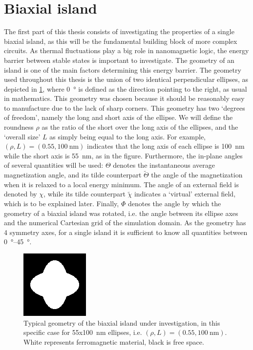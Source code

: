 \documentclass[11pt,a4paper,english]{article}
\begin{document}
\section{Biaxial island}
\label{par:Biaxial_island}
The first part of this thesis consists of investigating the properties of a single biaxial island, as this will be the fundamental building block of more complex circuits. As thermal fluctuations play a big role in nanomagnetic logic, the energy barrier between stable states is important to investigate. The geometry of an island is one of the main factors determining this energy barrier. The geometry used throughout this thesis is the union of two identical perpendicular ellipses, as depicted in \cref{fig:biaxial_island:geometryTypical}, where \SI{0}{\degree} is defined as the direction pointing to the right, as usual in mathematics. This geometry was chosen because it should be reasonably easy to manufacture due to the lack of sharp corners. This geometry has two `degrees of freedom', namely the long and short axis of the ellipse. We will define the roundness $\rho$ as the ratio of the short over the long axis of the ellipses, and the `overall size' $L$ as simply being equal to the long axis. For example, $(\rho, L)=(0.55, \SI{100}{\nano\metre})$ indicates that the long axis of each ellipse is \SI{100}{\nano\metre} while the short axis is \SI{55}{\nano\metre}, as in the figure. Furthermore, the in-plane angles of several quantities will be used: $\Theta$ denotes the instantaneous average magnetization angle, and its tilde counterpart $\widetilde{\Theta}$ the angle of the magnetization when it is relaxed to a local energy minimum. The angle of an external field is denoted by $\chi$, while its tilde counterpart $\widetilde{\chi}$ indicates a `virtual' external field, which is to be explained later. Finally, $\Phi$ denotes the angle by which the geometry of a biaxial island was rotated, i.e. the angle between its ellipse axes and the numerical Cartesian grid of the simulation domain.
As the geometry has 4 symmetry axes, for a single island it is sufficient to know all quantities between \SIrange{0}{45}{\degree}.
\begin{figure}
    \centering
    \includegraphics[width=0.3\columnwidth]{Figures/biaxial_island/Geometry/geomPlus55.png}
    \caption{Typical geometry of the biaxial island under investigation, in this specific case for 55x\SI{100}{\nano\metre} ellipses, i.e. $(\rho, L)=(0.55, \SI{100}{\nano\metre})$. White represents ferromagnetic material, black is free space.}
    \label{fig:biaxial_island:geometryTypical}
\end{figure}
\end{document}

